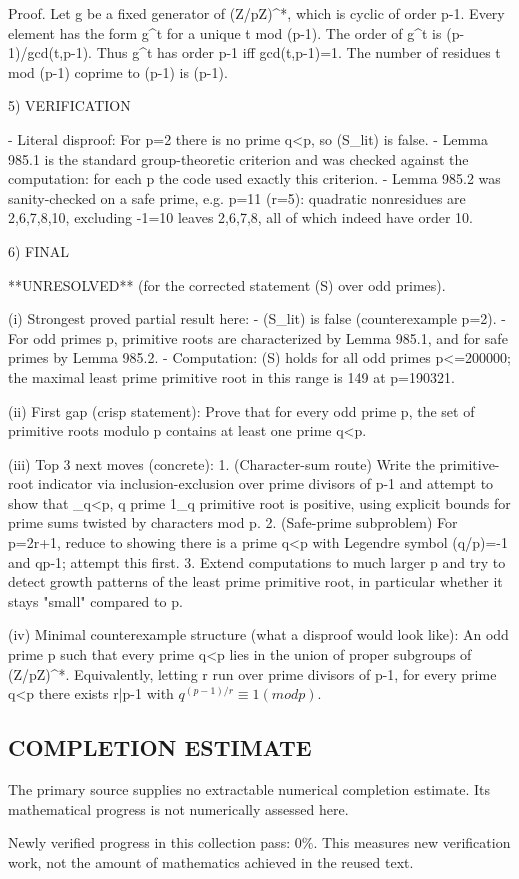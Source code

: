 Proof.
Let g be a fixed generator of (Z/pZ)^*, which is cyclic of order p-1. Every element has the
form g^t for a unique t mod (p-1). The order of g^t is (p-1)/gcd(t,p-1). Thus g^t has order
p-1 iff gcd(t,p-1)=1. The number of residues t mod (p-1) coprime to (p-1) is \varphi(p-1).

5) VERIFICATION

- Literal disproof: For p=2 there is no prime q<p, so (S_lit) is false.
- Lemma 985.1 is the standard group-theoretic criterion and was checked against the
  computation: for each p the code used exactly this criterion.
- Lemma 985.2 was sanity-checked on a safe prime, e.g. p=11 (r=5): quadratic nonresidues
  are {2,6,7,8,10}, excluding -1=10 leaves {2,6,7,8}, all of which indeed have order 10.

6) FINAL

**UNRESOLVED** (for the corrected statement (S) over odd primes).

(i) Strongest proved partial result here:
    - (S_lit) is false (counterexample p=2).
    - For odd primes p, primitive roots are characterized by Lemma 985.1, and for safe primes
      by Lemma 985.2.
    - Computation: (S) holds for all odd primes p<=200000; the maximal least prime primitive
      root in this range is 149 at p=190321.

(ii) First gap (crisp statement):
    Prove that for every odd prime p, the set of primitive roots modulo p contains at least
    one prime q<p.

(iii) Top 3 next moves (concrete):
    1. (Character-sum route) Write the primitive-root indicator via inclusion-exclusion over
       prime divisors of p-1 and attempt to show that \sum_{q<p, q prime} 1_{q primitive root}
       is positive, using explicit bounds for prime sums twisted by characters mod p.
    2. (Safe-prime subproblem) For p=2r+1, reduce to showing there is a prime q<p with
       Legendre symbol (q/p)=-1 and q\ne p-1; attempt this first.
    3. Extend computations to much larger p and try to detect growth patterns of the least
       prime primitive root, in particular whether it stays "small" compared to p.

(iv) Minimal counterexample structure (what a disproof would look like):
    An odd prime p such that every prime q<p lies in the union of proper subgroups of
    (Z/pZ)^*. Equivalently, letting r run over prime divisors of p-1,
      for every prime q<p there exists r|p-1 with \(q^{(p-1)/r} \equiv 1 (mod p)\).



\subsection*{COMPLETION ESTIMATE}
The primary source supplies no extractable numerical completion estimate. Its mathematical progress is not numerically assessed here.

Newly verified progress in this collection pass: $0\%$. This measures new verification work, not the amount of mathematics achieved in the reused text.
